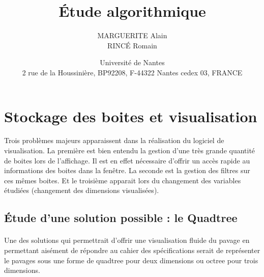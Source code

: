 \documentclass[11pt,a4paper,utf8x]{report}
\title{\'Etude algorithmique}
\author{MARGUERITE Alain\\ RINC\'E Romain}
\date{Université de Nantes \\ 2 rue de la Houssinière, BP92208, F-44322 Nantes cedex 03, FRANCE}
\begin{document}
\maketitle
\clearpage

\tableofcontents
\clearpage
\section{Stockage des boites et visualisation}
Trois problèmes majeurs apparaissent dans la réalisation du logiciel de visualisation. La première est bien entendu la gestion d'une très grande quantité de boites lors de l'affichage. Il est en effet nécessaire d'offrir un accès rapide au informations des boites dans la fenêtre. La seconde est la gestion des filtres sur ces mêmes boites. Et le troisième apparait lors du changement des variables étudiées (changement des dimensions visualisées).

\subsection{\'Etude d'une solution possible : le Quadtree}
\paragraph{}Une des solutions qui permettrait d'offrir une visualisation fluide du pavage en permettant aisément de répondre au cahier des spécifications serait de représenter le pavages sous une forme de quadtree pour deux dimensions ou octree pour trois dimensions.
\end{document}
